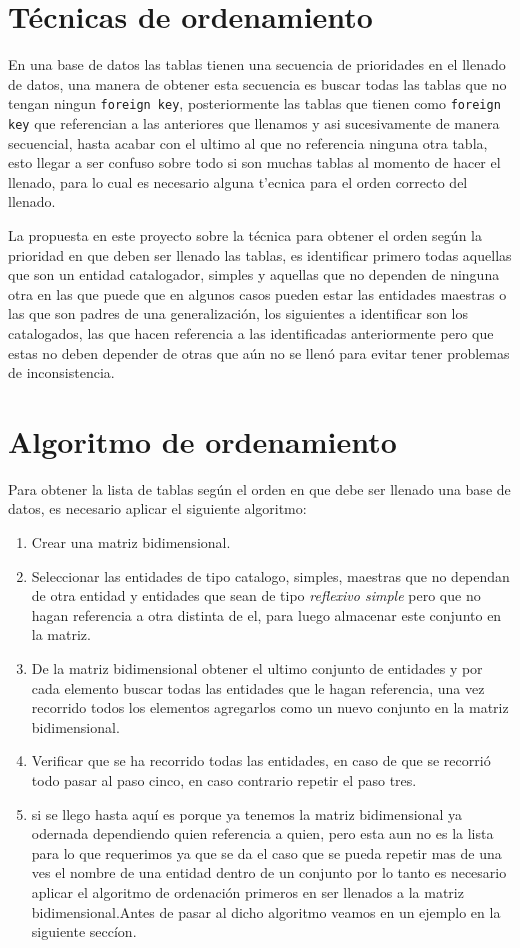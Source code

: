 \section{T\'ecnicas de ordenamiento}
En una base de datos las tablas tienen una secuencia de prioridades en el llenado de datos, una manera de obtener esta secuencia es buscar todas las tablas que no tengan ningun \texttt{foreign key}, posteriormente las tablas que tienen como \texttt{foreign key} que referencian a las anteriores que llenamos y asi sucesivamente de manera secuencial, hasta acabar con el ultimo al que no referencia ninguna otra tabla, esto llegar a ser confuso sobre todo si son muchas tablas al momento de hacer el llenado, para lo cual es necesario alguna t'ecnica para el orden correcto del llenado.

La propuesta en este proyecto sobre la t\'ecnica para obtener el orden seg\'un la prioridad en que deben ser llenado las tablas, es identificar primero todas aquellas que son un entidad catalogador, simples y  aquellas que no dependen de ninguna otra en las que puede que en algunos casos pueden estar las entidades maestras  o las que son padres de una generalizaci\'on, los  siguientes a identificar son los catalogados, las que hacen referencia a las identificadas anteriormente pero que estas no deben depender de otras que a\'un no se llen\'o para evitar  tener problemas de inconsistencia. 
\section{Algoritmo de ordenamiento}
\label{Algoritmo de ordenamiento}
Para obtener la lista de tablas seg\'un el orden en que debe ser llenado una base de datos,  es necesario aplicar el siguiente algoritmo:
\begin{enumerate}
\item Crear una matriz bidimensional.
\item Seleccionar las entidades de tipo catalogo, simples, maestras que no dependan de otra entidad y entidades que sean de tipo \textit{reflexivo simple} pero que no hagan referencia a otra distinta de el, para luego almacenar este conjunto en la matriz.
\item De la matriz bidimensional obtener el ultimo conjunto de entidades y por cada elemento buscar todas las entidades que le hagan referencia, una vez recorrido todos los elementos agregarlos como un nuevo conjunto en la matriz bidimensional.
\item Verificar que se ha recorrido todas las entidades, en caso de que se recorri\'o todo pasar al paso cinco, en caso contrario repetir el paso tres.
\item si se llego hasta aqu\'i es porque ya tenemos la matriz bidimensional ya odernada dependiendo quien referencia a quien, pero esta aun no es la lista para lo que requerimos ya que se da el caso que se pueda repetir mas de una ves el nombre de una entidad dentro de un conjunto por lo tanto es necesario aplicar el algoritmo de ordenaci\'on primeros en ser llenados a la matriz bidimensional.Antes de pasar al dicho algoritmo veamos en un ejemplo en la siguiente secc\'ion.
\end{enumerate}
